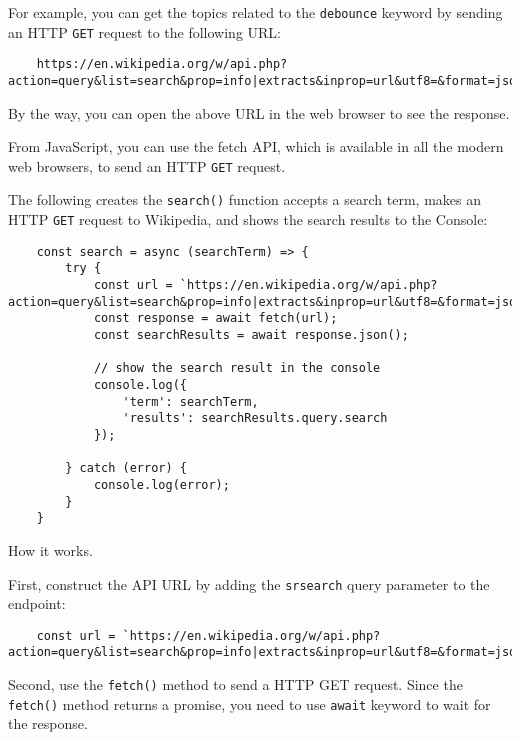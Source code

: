 \documentclass[11pt]{article}
\begin{document}
\noindent
For example, you can get the topics related to the \verb|debounce| keyword by
sending an HTTP \verb|GET| request to the following URL:

\begin{lstlisting}
    https://en.wikipedia.org/w/api.php?action=query&list=search&prop=info|extracts&inprop=url&utf8=&format=json&origin=*&srlimit=10&srsearch=debounce
\end{lstlisting}

\noindent
By the way, you can open the above URL in the web browser to see the response.
\newline

\noindent
From JavaScript, you can use the fetch API, which is available in all
the modern web browsers, to send an HTTP \verb|GET| request.
\newline

\noindent
The following creates the \verb|search()| function accepts a search term,
makes an HTTP \verb|GET| request to Wikipedia, and shows the search results
to the Console:

\begin{lstlisting}
    const search = async (searchTerm) => {
        try {
            const url = `https://en.wikipedia.org/w/api.php?action=query&list=search&prop=info|extracts&inprop=url&utf8=&format=json&origin=*&srlimit=10&srsearch=${searchTerm}`;
            const response = await fetch(url);
            const searchResults = await response.json();

            // show the search result in the console
            console.log({
                'term': searchTerm,
                'results': searchResults.query.search
            });

        } catch (error) {
            console.log(error);
        }
    }
\end{lstlisting}

\noindent
How it works.
\newline

\noindent
First, construct the API URL by adding the \verb|srsearch| query parameter
to the endpoint:

\begin{lstlisting}
    const url = `https://en.wikipedia.org/w/api.php?action=query&list=search&prop=info|extracts&inprop=url&utf8=&format=json&origin=*&srlimit=10&srsearch=${searchTerm}`;
\end{lstlisting}

\noindent
Second, use the \verb|fetch()| method to send a HTTP GET request. Since
the \verb|fetch()| method returns a promise, you need to use \verb|await| keyword
to wait for the response.
\newline
\end{document}

